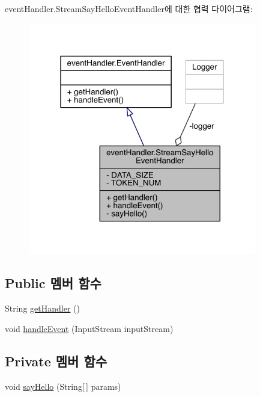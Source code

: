 event\+Handler.\+Stream\+Say\+Hello\+Event\+Handler에 대한 협력 다이어그램\+:
\nopagebreak
\begin{figure}[H]
\begin{center}
\leavevmode
\includegraphics[width=283pt]{classevent_handler_1_1_stream_say_hello_event_handler__coll__graph}
\end{center}
\end{figure}
\subsection*{Public 멤버 함수}
\begin{DoxyCompactItemize}
\item 
String \hyperlink{classevent_handler_1_1_stream_say_hello_event_handler_a2ff06320bb8ddd881d147d31a46d365b}{get\+Handler} ()
\item 
void \hyperlink{classevent_handler_1_1_stream_say_hello_event_handler_a859dc382ae8a35257af2149a9ed1c6b8}{handle\+Event} (Input\+Stream input\+Stream)
\end{DoxyCompactItemize}
\subsection*{Private 멤버 함수}
\begin{DoxyCompactItemize}
\item 
void \hyperlink{classevent_handler_1_1_stream_say_hello_event_handler_a6af4d6b8a6ed973d984a2eea55e405bc}{say\+Hello} (String\mbox{[}$\,$\mbox{]} params)
\end{DoxyCompactItemize}
